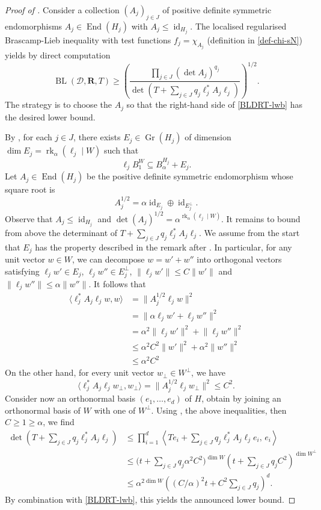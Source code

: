 \documentclass[a4paper,english]{amsart}
\theoremstyle{definition}
\newcommand{\1}{\mathbbm{1}}
\newcommand{\sD} {{\mathscr D}}
\newcommand{\bR}{\mathbf{R}}
\DeclareMathOperator{\End}{End}
\DeclareMathOperator{\id}{id}
\DeclareMathOperator{\rk}{rk}
\newcommand{\norm}[1]{\lVert#1\rVert}   %
\DeclareMathOperator{\Gr}{Gr}
\DeclareMathOperator{\BL}{BL}
\renewcommand{\subset}{\subseteq}
\begin{document}
\begin{proof}[Proof of ]
Consider a collection  $(A_j)_{j \in J}$ of positive definite symmetric endomorphisms $A_{j}\in \End(H_{j})$ with $A_{j}\leq  \id_{H_j}$. The localised regularised  Brascamp-Lieb inequality with  test functions $f_{j}=\chi_{A_{j}}$ (definition in \eqref{def-chi-sN}) yields by direct computation
\begin{equation}\label{BLDRT-lwb}
\BL(\sD, \bR, T) \geq \left(\frac{\prod_{j \in J} (\det A_j)^{q_{j}}}{\det\left(T + \sum\nolimits_{j \in J} q_j \ell_j^* A_j \ell_j \right)}\right)^{1/2}.
\end{equation}
The strategy is to choose the $A_{j}$ so that the right-hand side of \eqref{BLDRT-lwb} has the desired lower bound.


By , for each $j \in J$, there exists $E_j \in \Gr(H_j)$ of dimension $\dim E_j = \rk_\alpha(\ell_j \mid W)$ such that
\[
\ell_j B^W_1 \subset B^{H_j}_\alpha + E_j.
\]
Let $A_j \in \End(H_j)$ be the positive definite symmetric endomorphism whose square root is
\[
A_j^{1/2} = \alpha \id_{E_j} \oplus \id_{E_j^\perp}.
\]
Observe that $A_j \leq \id_{H_j}$ and $\det(A_j)^{1/2} = \alpha^{\rk_\alpha(\ell_j \mid W)}$. It remains to bound from above the determinant of $T+\sum_{j \in J} q_j \ell_j^* A_j \ell_j$. We assume from the start that $E_{j}$ has the property described in the remark after .
In particular, for any unit vector $w \in W$, we can decompose $w = w' + w''$ into orthogonal vectors satisfying $\ell_j w' \in E_j$, $\ell_j w'' \in E_j^\perp$, $\norm{\ell_j w'} \leq C\norm{w'}$ and $\norm{\ell_j w''} \leq \alpha \norm{w''}$.
It follows that
\begin{align*}
\langle \ell_j^* A_j \ell_j w, w \rangle &= \norm{A_j^{1/2} \ell_j w}^2 \\
&= \norm{ \alpha\ell_j w' + \ell_j w''}^2\\
&= \alpha^2 \norm{\ell_j w'}^2 + \norm{\ell_j w''}^2\\
&\leq \alpha^2 C^2\norm{w'}^2 + \alpha^2 \norm{w''}^2\\
&\leq \alpha^2 C^2
\end{align*}
On the other hand, for every unit vector $w_{\perp} \in W^\perp$, we have
\[
\langle \ell_j^* A_j \ell_j w_{\perp}, w_{\perp} \rangle = \norm{A_j^{1/2} \ell_j w_{\perp}}^2 \leq C^2.
\]
Consider now an orthonormal basis $(e_1, \dotsc, e_d)$ of $H$, obtain by joining an orthonormal basis of $W$ with one of $W^\perp$.
Using , the above inequalities, then $C\geq 1\geq \alpha$, we find
\begin{align*}
\det\left(T + \sum\nolimits_{j \in J} q_j \ell_j^* A_j \ell_j \right) &\leq \prod_{i = 1}^d \left\langle Te_i + \sum\nolimits_{j \in J} q_j \ell_j^* A_j \ell_j e_i, \,e_i \right\rangle\\
&\leq \Big(t + \sum\nolimits_{j \in J} q_j \alpha^2C^2 \Bigr)^{\dim W} \left(t + \sum\nolimits_{j \in J} q_j C^2\right)^{\dim W^\perp}\\
&\leq  \alpha^{2 \dim W}\left( (C/\alpha)^2 t + C^2\sum\nolimits_{j \in J} q_j \right)^d.
\end{align*}
By combination with \eqref{BLDRT-lwb}, this yields the announced lower bound.
\end{proof}
\end{document}
